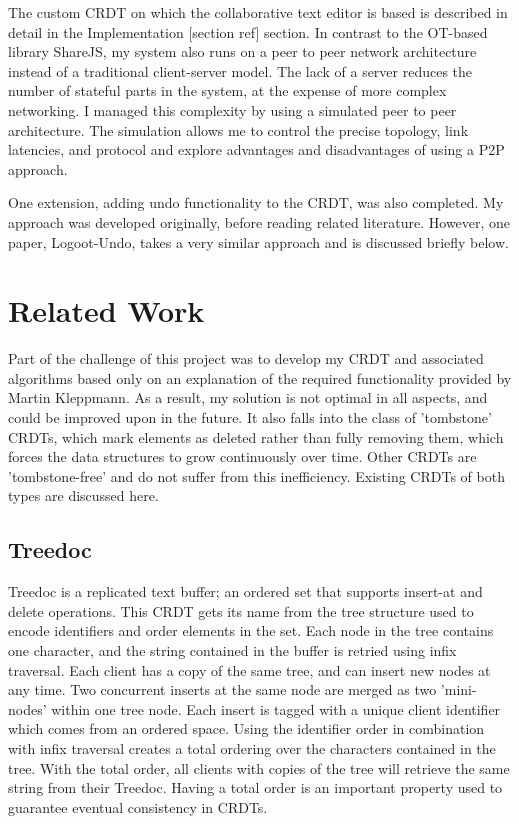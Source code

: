 \documentclass[12pt,a4paper,twoside,openright]{report}
\begin{document}
The custom CRDT on which the collaborative text editor is based is described in detail in the Implementation [section ref] section. In contrast to the OT-based library ShareJS, my system also runs on a peer to peer network architecture instead of a traditional client-server model. The lack of a server reduces the number of stateful parts in the system, at the expense of more complex networking. I managed this complexity by using a simulated peer to peer architecture. The simulation allows me to control the precise topology, link latencies, and protocol and explore advantages and disadvantages of using a P2P approach. 

One extension, adding undo functionality to the CRDT, was also completed. My approach was developed originally, before reading related literature. However, one paper, Logoot-Undo, takes a very similar approach and is discussed briefly below.

\section{Related Work}

Part of the challenge of this project was to develop my CRDT and associated algorithms based only on an explanation of the required functionality provided by Martin Kleppmann. As a result, my solution is not optimal in all aspects, and could be improved upon in the future. It also falls into the class of 'tombstone' CRDTs, which mark elements as deleted rather than fully removing them, which forces the data structures to grow continuously over time. Other CRDTs are 'tombstone-free' and do not suffer from this inefficiency. Existing CRDTs of both types are discussed here.

\subsection{Treedoc}

Treedoc \cite{preguica2009} is a replicated text buffer; an ordered set that supports insert-at and delete operations. This CRDT gets its name from the tree structure used to encode identifiers and order elements in the set. Each node in the tree contains one character, and the string contained in the buffer is retried using infix traversal. Each client has a copy of the same tree, and can insert new nodes at any time. Two concurrent inserts at the same node are merged as two 'mini-nodes' within one tree node. Each insert is tagged with a unique client identifier which comes from an ordered space. Using the identifier order in combination with infix traversal creates a total ordering over the characters contained in the tree. With the total order, all clients with copies of the tree will retrieve the same string from their Treedoc. Having a total order is an important property used to guarantee eventual consistency in CRDTs.
\end{document}
